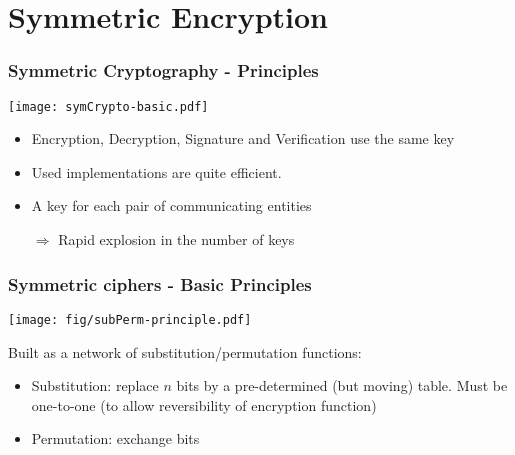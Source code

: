 \documentclass[
hyperref={pdfpagelabels=false}
,xcolor=table
]
{beamer}
\begin{document}
\section{Symmetric Encryption}


\begin{frame}
  \frametitle{Symmetric Cryptography - Principles}

  \begin{center}
    \texttt{[image: symCrypto-basic.pdf]}
  \end{center}

  \begin{itemize}
  \item Encryption, Decryption, Signature and Verification use the same key
  \item Used implementations are quite efficient. 
  \item A key for each pair of communicating entities
  \item[$\Rightarrow$] Rapid explosion in the number of keys
  \end{itemize}
\end{frame}


\begin{frame}
  \frametitle{Symmetric ciphers - Basic Principles}

  \begin{center}
    \texttt{[image: fig/subPerm-principle.pdf]}
  \end{center}
  
  Built as a network of substitution/permutation functions:
  \begin{itemize}
  \item Substitution: replace $n$ bits by a pre-determined (but moving) table. Must be one-to-one (to allow reversibility of encryption function)
  \item Permutation: exchange bits
  \end{itemize}
 
\end{frame}
\end{document}
